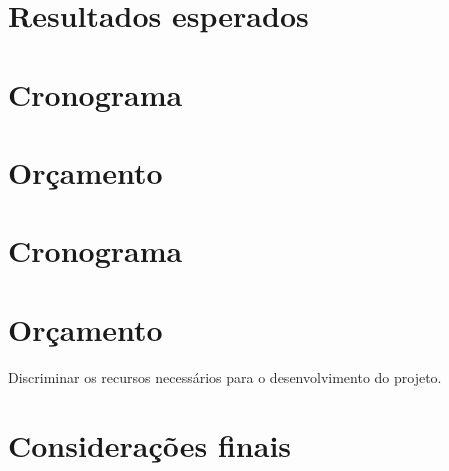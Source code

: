\documentclass[12pt,openright,a4paper,brazil]{abntex2}
\begin{document}
\chapter{Resultados esperados}

\chapter{Cronograma}

\chapter{Orçamento}

\chapter{Cronograma}

\chapter{Orçamento}
Discriminar os recursos necessários para o desenvolvimento do projeto.


\chapter*[Considerações finais]{Considerações finais}

\postextual




\printindex
\end{document}
